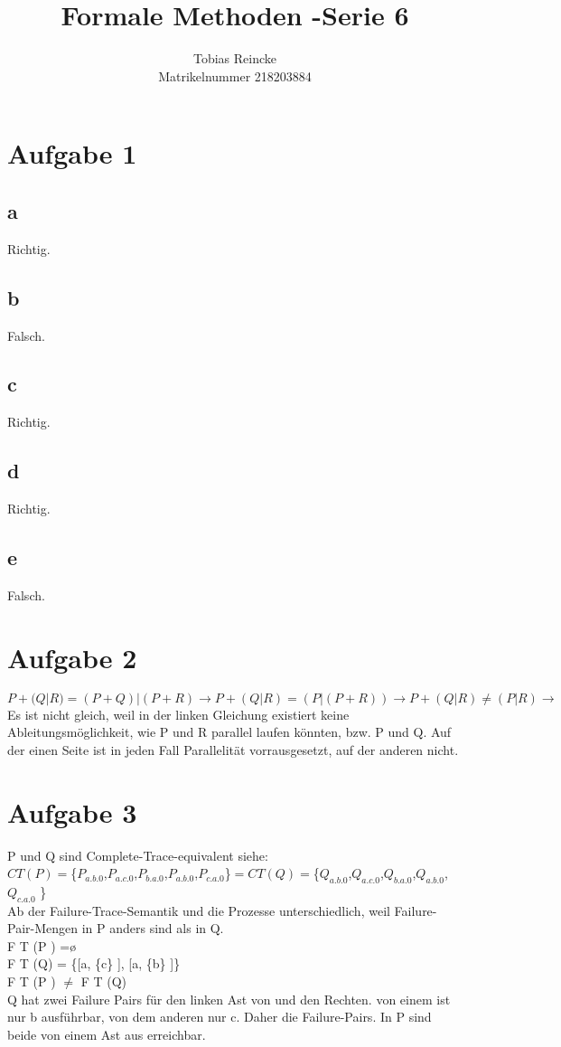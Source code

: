 \documentclass[]{article}
\title{Formale Methoden -Serie 6}
\author{Tobias Reincke\\ Matrikelnummer 218203884}
\begin{document}
\maketitle



\section{Aufgabe 1}
\subsection{a}
Richtig.
\subsection{b}
Falsch.
\subsection{c}
Richtig.
\subsection{d}
Richtig.
\subsection{e}
Falsch.

\section{Aufgabe 2}
$$ P + (Q|R) = (P+Q)|(P+R) \rightarrow
P + (Q|R) = (P| (P+R)) \rightarrow
P + (Q|R) \neq (P| R)  \rightarrow 
$$  Es ist nicht gleich, weil in der linken Gleichung existiert keine Ableitungsmöglichkeit, wie P und R parallel laufen könnten, bzw. P und Q. Auf der einen Seite ist in jeden Fall Parallelität vorrausgesetzt, auf der anderen nicht. \newpage

\section{Aufgabe 3}
P und Q sind Complete-Trace-equivalent siehe:
\\$CT(P)$$=$\{$P_{a.b.0}$,$P_{a.c.0}$,$P_{b.a.0}$,$P_{a.b.0}$,$P_{c.a.0}$\}$=CT(Q)=$\{$Q_{a.b.0}$,$Q_{a.c.0}$,$Q_{b.a.0}$,$Q_{a.b.0}$,$Q_{c.a.0}$ \} \\
Ab der Failure-Trace-Semantik und die Prozesse unterschiedlich, weil Failure-
Pair-Mengen in P anders sind als in Q.
\\
F T (P ) =ø
\\
F T (Q) = \{[a, \{c\} ], [a, \{b\} ]\} \\
F T (P ) $\neq$ F T (Q)
\\
Q hat zwei Failure Pairs für den linken Ast von und den Rechten. von einem ist
nur b ausführbar, von dem anderen nur c. Daher die Failure-Pairs. In P sind
beide von einem Ast aus erreichbar.
\end{document}
